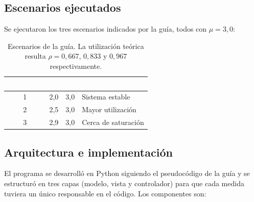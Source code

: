 \documentclass[11pt,a4paper]{article}
\renewcommand{\arraystretch}{1.08}
\begin{document}
\subsection{Escenarios ejecutados}

Se ejecutaron los tres escenarios indicados por la guía, todos con $\mu = 3{,}0$:

\begin{table}[h!]
\centering
\setlength{\arrayrulewidth}{0.75pt}
\renewcommand{\arraystretch}{1.25}
\begin{tabular}{|c|c|c|l|}
\hline
\rowcolor{headerblue}
\textbf{\textcolor{white}{Escenario}} & \textbf{\textcolor{white}{$\lambda$}} & \textbf{\textcolor{white}{$\mu$}} & \textbf{\textcolor{white}{Condición}} \\ \hline
1 & 2{,}0 & 3{,}0 & Sistema estable \\ \hline
\rowcolor{rowlight}
2 & 2{,}5 & 3{,}0 & Mayor utilización \\ \hline
3 & 2{,}9 & 3{,}0 & Cerca de saturación \\ \hline
\end{tabular}
\caption{Escenarios de la guía. La utilización teórica resulta $\rho = 0{,}667$,
$0{,}833$ y $0{,}967$ respectivamente.}
\end{table}

\subsection{Arquitectura e implementación}

El programa se desarrolló en Python siguiendo el pseudocódigo de la guía y se
estructuró en tres capas (modelo, vista y controlador) para que cada medida tuviera un
único responsable en el código. Los componentes son:
\end{document}

